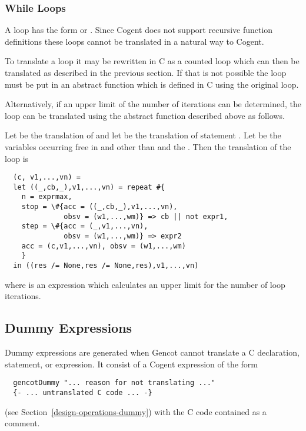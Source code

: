 \subsubsection{While Loops}

A  loop has the form  or . Since Cogent does not support recursive 
function definitions these loops cannot be translated in a natural way to Cogent.

To translate a  loop it may be rewritten in C as a counted  loop which can then be translated 
as described in the previous section. If that is not possible the loop must be put in an abstract function which is 
defined in C using the original  loop.

Alternatively, if an upper limit of the number of iterations can be determined, the loop can be translated using the 
abstract  function described above as follows.

Let  be the translation of  and let  be the translation of 
statement . Let  be the variables occurring free in  and  other than 
 and the .
Then the translation of the loop  is
\begin{verbatim}
  (c, v1,...,vn) = 
  let ((_,cb,_),v1,...,vn) = repeat #{
    n = exprmax,
    stop = \#{acc = ((_,cb,_),v1,...,vn), 
              obsv = (w1,...,wm)} => cb || not expr1,
    step = \#{acc = (_,v1,...,vn), 
              obsv = (w1,...,wm)} => expr2
    acc = (c,v1,...,vn), obsv = (w1,...,wm)
    }
  in ((res /= None,res /= None,res),v1,...,vn)
\end{verbatim}
where  is an expression which calculates an upper limit for the number of loop iterations.

\subsection{Dummy Expressions}
\label{design-cstats-dummy}

Dummy expressions are generated when Gencot cannot translate a C declaration, statement, or expression. It consist of 
a Cogent expression of the form
\begin{verbatim}
  gencotDummy "... reason for not translating ..."
  {- ... untranslated C code ... -}
\end{verbatim}
(see Section~\ref{design-operations-dummy}) with the C code contained as a comment.

